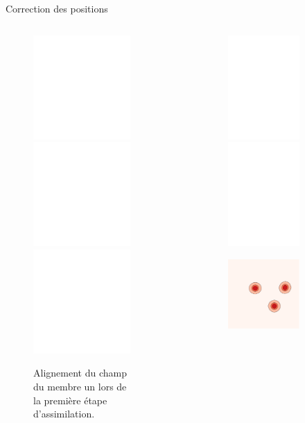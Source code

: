 \documentclass[aspectratio=169]{beamer} %
\begin{document}
\begin{frame}{Correction des positions}
    \vspace{-0.5cm}
    \begin{columns}[c]
        \begin{column}{0.45\textwidth}
            \begin{figure}
                \centering
                \caption*{\tiny Alignement du champ du membre un lors de la première étape d'assimilation.}
                \includegraphics<1>[width=\textwidth]{../../conference/images/align_member/align_member_prior.pdf}
                \includegraphics<2>[width=\textwidth]{../../conference/images/align_member/align_member_prior_field.pdf}
                \includegraphics<3->[width=\textwidth]{../../conference/images/align_member/align_member_final.pdf}
            \end{figure}
        \end{column}
        \begin{column}{0.55\textwidth}
            \begin{figure}[c]
                \centering
                \caption*{\tiny Correction du champ de vorticité lors de la première étape d'assimilation.}
                \begin{subfigure}{0.49\textwidth}
                    \centering
                    \includegraphics<1-2>[width=\textwidth]{../../conference/images/vorticity_prior.pdf}
                    \includegraphics<3>[width=\textwidth]{../../conference/images/vorticity_align.pdf}
                \end{subfigure}
                \begin{subfigure}{0.49\textwidth}
                    \centering
                    \includegraphics[width=\textwidth]{../../conference/images/vorticity_ref.pdf}

\end{subfigure}
\end{figure}
\end{column}
\end{columns}
\end{frame}
\end{document}
